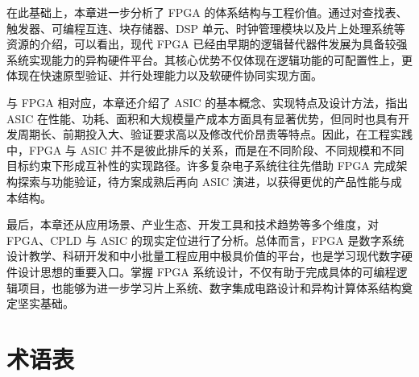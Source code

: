 在此基础上，本章进一步分析了 FPGA
的体系结构与工程价值。通过对查找表、触发器、可编程互连、块存储器、DSP
单元、时钟管理模块以及片上处理系统等资源的介绍，可以看出，现代 FPGA
已经由早期的逻辑替代器件发展为具备较强系统实现能力的异构硬件平台。其核心优势不仅体现在逻辑功能的可配置性上，更体现在快速原型验证、并行处理能力以及软硬件协同实现方面。

与 FPGA 相对应，本章还介绍了 ASIC 的基本概念、实现特点及设计方法，指出
ASIC
在性能、功耗、面积和大规模量产成本方面具有显著优势，但同时也具有开发周期长、前期投入大、验证要求高以及修改代价昂贵等特点。因此，在工程实践中，FPGA
与 ASIC
并不是彼此排斥的关系，而是在不同阶段、不同规模和不同目标约束下形成互补性的实现路径。许多复杂电子系统往往先借助
FPGA 完成架构探索与功能验证，待方案成熟后再向 ASIC
演进，以获得更优的产品性能与成本结构。

最后，本章还从应用场景、产业生态、开发工具和技术趋势等多个维度，对
FPGA、CPLD 与 ASIC 的现实定位进行了分析。总体而言，FPGA
是数字系统设计教学、科研开发和中小批量工程应用中极具价值的平台，也是学习现代数字硬件设计思想的重要入口。掌握
FPGA
系统设计，不仅有助于完成具体的可编程逻辑项目，也能够为进一步学习片上系统、数字集成电路设计和异构计算体系结构奠定坚实基础。

\section{术语表}\label{ux672fux8bedux8868}

